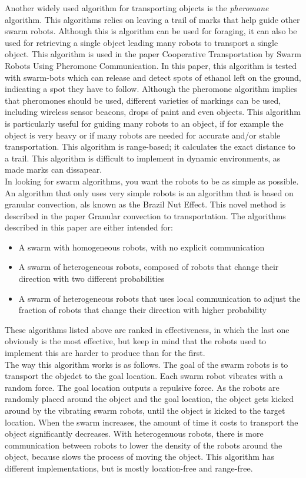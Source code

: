 Another widely used algorithm for transporting objects is the \emph{pheromone} algorithm. 
This algorithms relies on leaving a trail of marks that help guide other swarm robots. 
Although this is algorithm can be used for foraging, it can also be used for retrieving a single object leading many robots to transport a single object.
This algorithm is used in the paper Cooperative Transportation by Swarm Robots Using Pheromone Communication. \cite{Fujisawa2013}
 In this paper, this algorithm is tested with swarm-bots which can release and detect spots of ethanol left on the ground, indicating a spot they have to follow. Although the pheromone algorithm implies that pheromones should be used, different varieties of markings can be used, including wireless sensor beacons, drops of paint and even objects. This algorithm is particularly useful for guiding many robots to an object, if for example the object is very heavy or if many robots are needed for accurate and/or stable transportation. This algorithm is range-based; it calculates the exact distance to a trail. This algorithm is difficult to implement in dynamic environments, as made marks can dissapear. \\

In looking for swarm algorithms, you want the robots to be as simple as possible. An algorithm that only uses very simple robots is an algorithm that is based on granular convection, als known as the Brazil Nut Effect. This novel method is described in the paper Granular convection to transportation.\cite{Sugawara2012} The algorithms described in this paper are either intended for:

\begin{itemize}
  \item A swarm with homogeneous robots, with no explicit communication
  \item A swarm of heterogeneous robots, composed of robots that change their direction with two different probabilities
  \item A swarm of heterogeneous robots that uses local communication to adjust the fraction of robots that change their direction with higher probability
\end{itemize}

These algorithms listed above are ranked in effectiveness, in which the last one obviously is the most effective, but keep in mind that the robots used to implement this are harder to produce than for the first. \\ The way this algorithm works is as follows. The goal of the swarm robots is to transport the objedct to the goal location. Each swarm robot vibrates with a random force. The goal location outputs a repulsive force. As the robots are randomly placed around the object and the goal location, the object gets kicked around by the vibrating swarm robots, until the object is kicked to the target location. When the swarm increases, the amount of time it costs to transport the object significantly decreases. With heterogenuous robots, there is more communication between robots to lower the density of the robots around the object, because slows the process of moving the object.  This algorithm has different implementations, but is mostly location-free and  range-free. 

